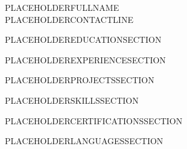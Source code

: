 \documentclass[letterpaper,11pt]{article}
\begin{document}
\begin{center}
    {\Huge \scshape PLACEHOLDERFULLNAME} \\ \vspace{1pt}
    \small PLACEHOLDERCONTACTLINE
    \vspace{-8pt}
\end{center}

PLACEHOLDEREDUCATIONSECTION

PLACEHOLDEREXPERIENCESECTION

PLACEHOLDERPROJECTSSECTION

PLACEHOLDERSKILLSSECTION

PLACEHOLDERCERTIFICATIONSSECTION

PLACEHOLDERLANGUAGESSECTION
\end{document}

